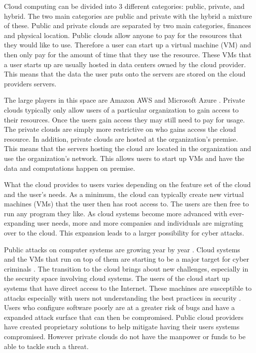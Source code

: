 \documentclass[12pt]{article}
\begin{document}
Cloud computing can be divided into 3 different categories: public, private, and hybrid.  The two main categories are public and private with the hybrid a mixture of these. Public and private clouds are separated by two main categories, finances and physical location. Public clouds allow anyone to pay for the resources that they would like to use. Therefore a user can start up a virtual machine (VM) and then only pay for the amount of time that they use the resource. These VMs that a user starts up are usually hosted in data centers owned by the cloud provider. This means that the data the user puts onto the servers are stored on the cloud providers servers.

The large players in this space are Amazon AWS \cite{amazonAWS} and Microsoft Azure \cite{Azure2017}. Private clouds typically only allow users of a particular organization to gain access to their resources. Once the users gain access they may still need to pay for usage. The private clouds are simply more restrictive on who gains access the cloud resource. In addition, private clouds are hosted at the organization's premise.  This means that the servers hosting the cloud are located in the organization and use the organization's network. This allows users to start up VMs and have the data and computations happen on premise.

What the cloud provides to users varies depending on the feature set of the cloud and the user's needs. As a minimum, the cloud can typically create new virtual machines (VMs) that the user then has root access to. The users are then free to run any program they like. As cloud systems become more advanced with ever-expanding user needs, more and more companies and individuals are migrating over to the cloud\cite{kondo2009cost}. This expansion leads to a larger possibility for cyber attacks.

Public attacks on computer systems are growing year by year \cite{newman_2017}. Cloud systems and the VMs that run on top of them are starting to be a major target for cyber criminals \cite{kellerman}. The transition to the cloud brings about new challenges, especially in the security space involving cloud systems. The users of the cloud start up systems that have direct access to the Internet. These machines are susceptible to attacks especially with users not understanding the best practices in security \cite{ng2009studying}. Users who configure software poorly are at a greater risk of bugs and have a expanded attack surface that can then be compromised.  Public cloud providers have created proprietary solutions to help mitigate having their users systems compromised. However private clouds do not have the manpower or funds to be able to tackle such a threat.
\end{document}

